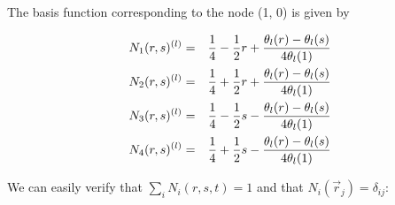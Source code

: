 The basis function corresponding to the node (1, 0) is given by
\begin{mdframed}[backgroundcolor=blue!5]
\begin{eqnarray}
N_1(r,s)^{(l)} &=& \frac{1}{4} - \frac{1}{2} r + \frac{\theta_l(r)-\theta_l(s)}{4 \theta_l(1)}  \nonumber\\
N_2(r,s)^{(l)} &=& \frac{1}{4} + \frac{1}{2} r + \frac{\theta_l(r)-\theta_l(s)}{4 \theta_l(1)}  \nonumber\\
N_3(r,s)^{(l)} &=& \frac{1}{4} - \frac{1}{2} s - \frac{\theta_l(r)-\theta_l(s)}{4 \theta_l(1)}  \nonumber\\
N_4(r,s)^{(l)} &=& \frac{1}{4} + \frac{1}{2} s - \frac{\theta_l(r)-\theta_l(s)}{4 \theta_l(1)}  
\end{eqnarray}
\end{mdframed}
We can easily verify that $\sum_i N_i(r,s,t)=1$ and that $N_i(\vec{r}_j)=\delta_{ij}$:
